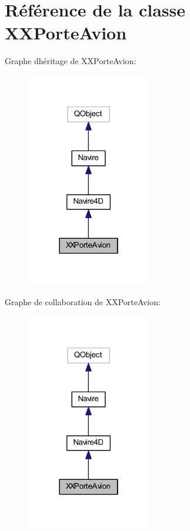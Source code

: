 \hypertarget{class_x_x_porte_avion}{}\section{Référence de la classe X\+X\+Porte\+Avion}
\label{class_x_x_porte_avion}


Graphe d\textquotesingle{}héritage de X\+X\+Porte\+Avion\+:
\nopagebreak
\begin{figure}[H]
\begin{center}
\leavevmode
\includegraphics[width=154pt]{class_x_x_porte_avion__inherit__graph}
\end{center}
\end{figure}


Graphe de collaboration de X\+X\+Porte\+Avion\+:
\nopagebreak
\begin{figure}[H]
\begin{center}
\leavevmode
\includegraphics[width=154pt]{class_x_x_porte_avion__coll__graph}
\end{center}
\end{figure}
